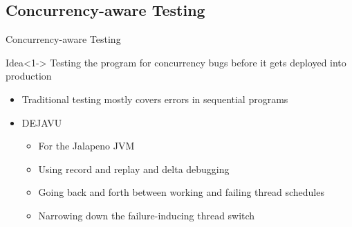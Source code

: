 \documentclass[english,aspectratio=43,t]{beamer}
\begin{document}
\subsection{Concurrency-aware Testing}
\frame\sectionpage

\begin{frame}{Concurrency-aware Testing}
    \begin{block}{Idea}<1->
        Testing the program for concurrency bugs before it gets deployed into production
    \end{block}
    \begin{itemize}
        \item<2-> Traditional testing mostly covers errors in sequential programs~\cite{lu2008mistakes}
        \item<3-> DEJAVU~\cite{acm2002}
        \begin{itemize}
            \item For the Jalapeno JVM
            \item Using record and replay and delta debugging
            \item Going back and forth between working and failing thread schedules
            \item Narrowing down the failure-inducing thread switch
        \end{itemize}
    \end{itemize}
\end{frame}
\end{document}
